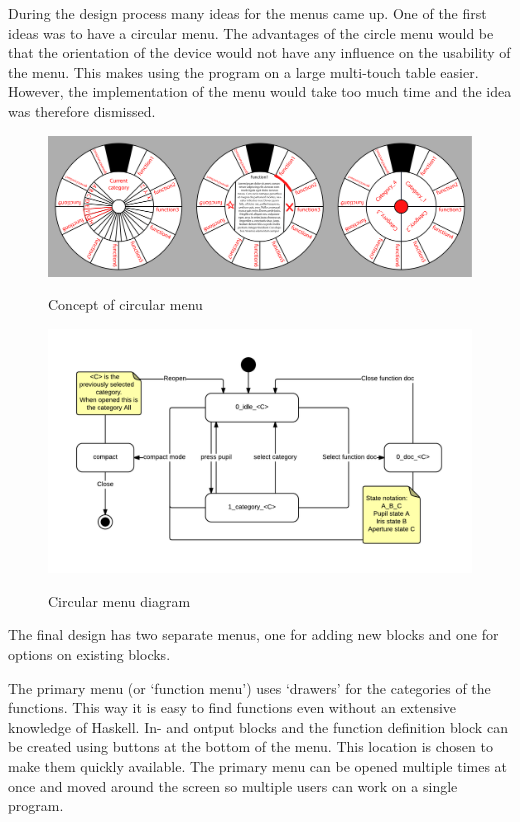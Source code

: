 During the design process many ideas for the menus came up.
One of the first ideas was to have a circular menu. \label{circular_menu} 
The advantages of the circle menu would be that the orientation of the device would not have any influence on the usability of the menu.
This makes using the program on a large multi-touch table easier.
However, the implementation of the menu would take too much time and the idea was therefore dismissed.

\begin{figure}[p]
	\centering
	\includegraphics[width=\textwidth]{Images/circlary}
	\label{fig:circlary}
	\caption{Concept of circular menu}
\end{figure}
\begin{figure}[p]
	\centering
	\includegraphics[scale=0.5]{Images/diagram-circlary}
	\label{fig:diagram-circlary}
	\caption{Circular menu diagram}
\end{figure}

The final design has two separate menus, one for adding new blocks and one for options on existing blocks.

The primary menu (or `function menu') uses `drawers' for the categories of the functions.  
This way it is easy to find functions even without an extensive knowledge of Haskell.
In- and ontput blocks and the function definition block can be created using buttons at the bottom of the menu.
This location is chosen to make them quickly available.
The primary menu can be opened multiple times at once and moved around the screen so multiple users can work on a single program.

